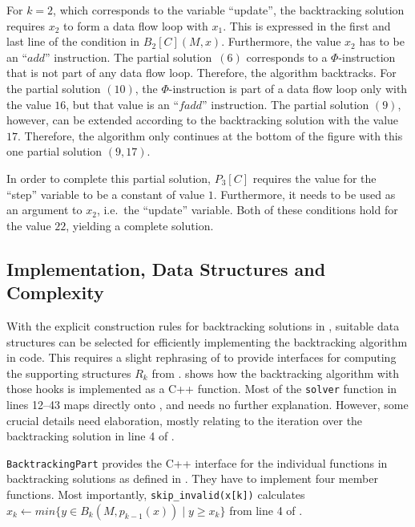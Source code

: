     For $k=2$, which corresponds to the variable ``update'', the backtracking
    solution requires $x_2$ to form a data flow loop with $x_1$.
    This is expressed  in the first and last line of the condition in
    $B_2[C](M,x)$.
    Furthermore, the value $x_2$ has to be an ``$add$'' instruction.
    The partial solution~$(6)$ corresponds to a $\Phi$-instruction that is not
    part of any data flow loop.
    Therefore, the algorithm backtracks.
    For the partial solution $(10)$, the $\Phi$-instruction is part of a data
    flow loop only with the value $16$, but that value is an ``$fadd$''
    instruction.
    The partial solution $(9)$, however, can be extended according to the
    backtracking solution with the value $17$.
    Therefore, the algorithm only continues at the bottom of the figure with
    this one partial solution $(9,17)$.

    In order to complete this partial solution, $P_3[C]$ requires the value for
    the ``step'' variable to be a constant of value $1$.
    Furthermore, it needs to be used as an argument to $x_2$, i.e.\ the
    ``update'' variable.
    Both of these conditions hold for the value $22$, yielding a complete
    solution.

\subsection{Implementation, Data Structures and Complexity}
\label{subsec:impl}

\begin{figure}[p]
    
\end{figure}

    With the explicit construction rules for backtracking solutions in
    , suitable data structures
    can be selected for efficiently implementing the
    backtracking algorithm in code.
    This requires a slight rephrasing of  to provide
    interfaces for computing the supporting structures $R_k$ from
    .
     shows how the backtracking algorithm with those hooks is
    implemented as a C++ function.
    Most of the \texttt{solver} function in lines 12--43 maps directly onto
    , and needs no further explanation.
    However, some crucial details need elaboration, mostly relating to the
    iteration over the backtracking solution in line 4 of .

    {\tt BacktrackingPart} provides the C++ interface for the individual
    functions in backtracking solutions as defined in .
    They have to implement four member functions.
    Most importantly, \texttt{skip\_invalid(x[k])} calculates
    $x_k\gets min\{y\in B_k(M,p_{k-1}(x))\mid y\geq x_k\}$
    from line 4 of .

